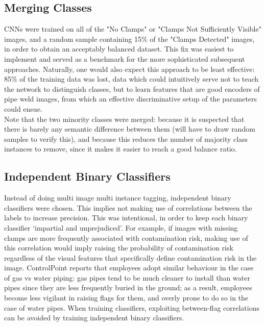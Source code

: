 \documentclass[a4paper,11pt]{article}
\begin{document}
\subsection{Merging Classes}

CNNs were trained on all of the "No Clamps" or "Clamps Not Sufficiently Visible" images, and a random sample containing 15\% of the "Clamps Detected" images, in order to obtain an acceptably balanced dataset. This fix was easiest to implement and served as a benchmark for the more sophisticated subsequent approaches. Naturally, one would also expect this approach to be least effective: 85\% of the training data was lost, data which could intuitively serve not to teach the network to distinguish classes, but to learn features that are good encoders of pipe weld images, from which an effective discriminative setup of the parameters could ensue. \\

Note that the two minority classes were merged: because it is suspected that there is barely any semantic difference between them (will have to draw random samples to verify this), and because this reduces the number of majority class instances to remove, since it makes it easier to reach a good balance ratio. \\


\subsection{Independent Binary Classifiers}

Instead of doing multi image multi instance tagging, independent binary classifiers were chosen. This implies not making use of correlations between the labels to increase precision. This was intentional, in order to keep each binary classifier `impartial and unprejudiced'. For example, if images with missing clamps are more frequently associated with contamination risk, making use of this correlation would imply raising the probability of contamination risk regardless of the visual features that specifically define contamination risk in the image. ControlPoint reports that employees adopt similar behaviour in the case of gas vs water piping: gas pipes tend to be much cleaner to install than water pipes since they are less frequently buried in the ground; as a result, employees become less vigilant in raising flags for them, and overly prone to do so in the case of water pipes. When training classifiers, exploiting between-flag correlations can be avoided by training independent binary classifiers.
\end{document}
